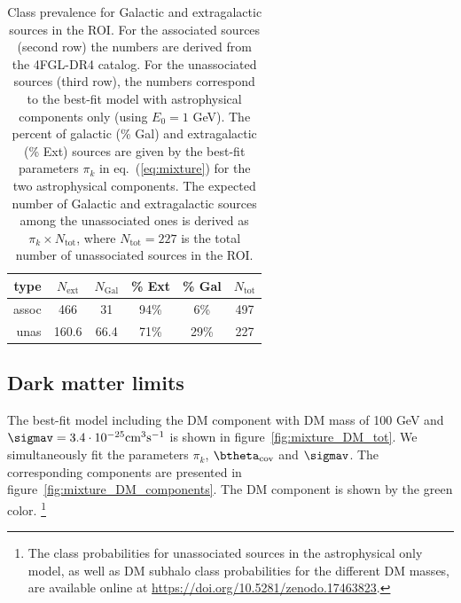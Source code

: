 \begin{table}[t]
\centering
\begin{tabular}{|rccccc|}
\toprule
type & $N_{\textrm{ext}}$ & $N_{\textrm{Gal}}$ & \% Ext & \% Gal & $N_{\textrm{tot}}$\\
\midrule
assoc & 466 & 31 & 94\% & 6\% & 497\\
unas & 160.6 & 66.4 & 71\% & 29\% & 227\\
\bottomrule
\end{tabular}
\caption{Class prevalence for Galactic and extragalactic sources in the ROI. 
For the associated sources (second row) the numbers are derived from the 4FGL-DR4 catalog. 
For the unassociated sources (third row), the numbers correspond to the best-fit model with astrophysical components only (using $E_0 = 1$ GeV). 
The percent of galactic (\% Gal) and extragalactic (\% Ext) sources are given by the best-fit parameters $\pi_k$ in eq.~(\ref{eq:mixture}) for the two astrophysical components.
The expected number of Galactic and extragalactic sources among the unassociated ones is derived as $\pi_k \times N_\textrm{tot}$, where $N_\textrm{tot} = 227$ is the total number of unassociated sources in the ROI.
}
\label{tab:class_prevalence_astro}
\end{table}


\subsection{Dark matter limits}
\label{sec:dm-limits}

The best-fit model including the DM component with DM mass of 100 GeV and $\sigmav=3.4 \cdot 10^{-25} \textrm{cm}^3\textrm{s}^{-1}$ is shown in figure~\ref{fig:mixture_DM_tot}.
We simultaneously fit the parameters $\pi_k$, $\btheta_\textrm{cov}$ and $\sigmav$.
The corresponding components are presented in figure~\ref{fig:mixture_DM_components}.
The DM component is shown by the green color.%
\footnote{The class probabilities for unassociated sources in the astrophysical only model, as well as DM subhalo class probabilities for the different DM masses, are available online at \href{https://doi.org/10.5281/zenodo.17463823}{https://doi.org/10.5281/zenodo.17463823}.
}


